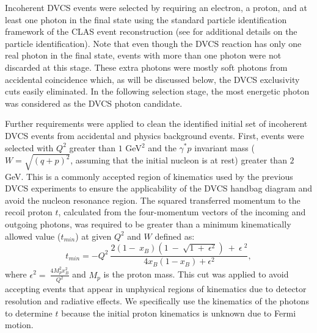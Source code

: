 \documentclass[twocolumn,nofootinbib,prl,superscriptaddress,secnumarabic,amssymb,nobibnotes,aps,floatfix]{revtex4}
\begin{document}
Incoherent DVCS events were selected by requiring an electron, a proton, and at 
least one photon in the final state using the standard particle identification 
framework of the CLAS event reconstruction (see \cite{Hattawy:thesis} for 
additional details on the particle identification). Note that even though the 
DVCS reaction has only one real photon in the final state, events with more 
than one photon were not discarded at this stage. These extra photons were 
mostly soft photons from accidental coincidence which, as will be discussed 
below, the DVCS exclusivity cuts easily eliminated.  In the following selection 
stage, the most energetic photon was considered as the DVCS photon candidate.

Further requirements were applied to clean the identified initial set of 
incoherent DVCS events from accidental and physics background events. 
First, events were selected with $Q^2$ greater than $1$ GeV$^2$ and the 
$\gamma^*p$ invariant mass ($W=\sqrt{(q+p)^2}$, assuming that the initial 
nucleon is at rest) greater than $2$ GeV. This is a commonly accepted region of 
kinematics used by the previous DVCS experiments to ensure the applicability of 
the DVCS handbag diagram and avoid the nucleon resonance region. The squared 
transferred momentum to the recoil proton $t$, calculated from the 
four-momentum vectors of the incoming and outgoing photons, was required to be 
greater than a minimum kinematically allowed value ($t_{min}$) at given $Q^2$ 
and $W$ defined as: \begin{equation}
t_{min} 
   =-Q^{2}~\frac{2(1-~x_{B})(1~-~\sqrt{1~+~\epsilon^{2}})~+~\epsilon~^{2}}{4x_{B}(1-x_{B})+\epsilon^{2}},
\end{equation}
where $\epsilon^{2}=~\frac{4M^{2}_{p}x^{2}_{B}}{Q^{2}}$ and $M_{p}$ is the 
proton mass. This cut was applied to avoid accepting events that appear in  
unphysical regions of kinematics due to detector resolution and radiative 
effects.  We specifically use the kinematics of the photons to determine $t$ 
because the initial proton kinematics is unknown due to Fermi motion. 
\end{document}
